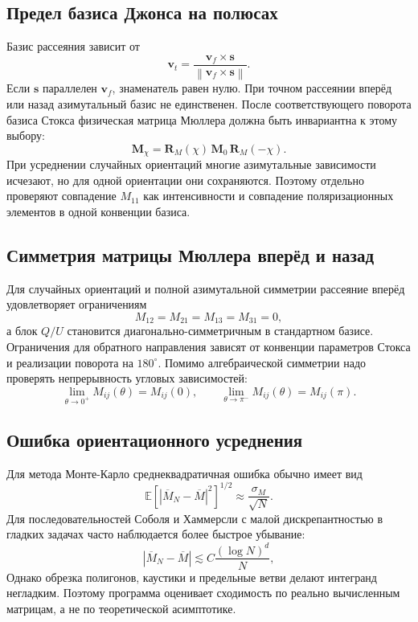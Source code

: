 \documentclass[11pt,a4paper]{article}
\newcommand{\vect}[1]{\symbf{#1}}
\newcommand{\matr}[1]{\symbf{#1}}
\newcommand{\norm}[1]{\left\lVert #1 \right\rVert}
\begin{document}
\subsection{Предел базиса Джонса на полюсах}

Базис рассеяния зависит от
\[
  \vect v_t =
  \frac{\vect v_f\times\vect s}
       {\norm{\vect v_f\times\vect s}}.
\]
Если $\vect s$ параллелен $\vect v_f$, знаменатель равен нулю. При точном
рассеянии вперёд или назад азимутальный базис не единственен. После
соответствующего поворота базиса Стокса физическая матрица Мюллера должна быть
инвариантна к этому выбору:
\[
  \matr M_{\chi}
  =
  \matr R_M(\chi)\,
  \matr M_0\,
  \matr R_M(-\chi).
\]
При усреднении случайных ориентаций многие азимутальные зависимости исчезают,
но для одной ориентации они сохраняются. Поэтому отдельно проверяют совпадение
$M_{11}$ как интенсивности и совпадение поляризационных элементов в одной
конвенции базиса.

\subsection{Симметрия матрицы Мюллера вперёд и назад}

Для случайных ориентаций и полной азимутальной симметрии рассеяние вперёд
удовлетворяет ограничениям
\[
  M_{12}=M_{21}=M_{13}=M_{31}=0,
\]
а блок $Q/U$ становится диагонально-симметричным в стандартном базисе.
Ограничения для обратного направления зависят от конвенции параметров Стокса
и реализации поворота на $180^\circ$. Помимо алгебраической симметрии надо
проверять непрерывность угловых зависимостей:
\[
  \lim_{\theta\to0^+} M_{ij}(\theta)=M_{ij}(0),
  \qquad
  \lim_{\theta\to\pi^-} M_{ij}(\theta)=M_{ij}(\pi).
\]

\subsection{Ошибка ориентационного усреднения}

Для метода Монте-Карло среднеквадратичная ошибка обычно имеет вид
\[
  \mathbb E\left[
  \left|\overline M_N-\overline M\right|^2
  \right]^{1/2}
  \approx
  \frac{\sigma_M}{\sqrt N}.
\]
Для последовательностей Соболя и Хаммерсли с малой дискрепантностью в гладких
задачах часто наблюдается более быстрое убывание:
\[
  \left|\overline M_N-\overline M\right|
  \lesssim
  C\frac{(\log N)^d}{N},
\]
Однако обрезка полигонов, каустики и предельные ветви делают интегранд
негладким. Поэтому программа оценивает сходимость по реально вычисленным
матрицам, а не по теоретической асимптотике.
\end{document}
